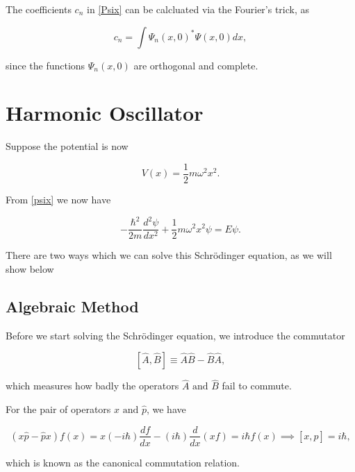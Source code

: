 \documentclass[a4paper,12pt]{report}
\begin{document}
The coefficients \(c_{n} \) in \cref{Psix} can be calcluated via the Fourier's trick, as 

\begin{equation}
  c_{n} = \int \Psi _{n}(x,0)^* \Psi (x,0) dx,  
\end{equation}

since the functions \(\Psi _{n}(x,0) \) are orthogonal and complete.

\section{Harmonic Oscillator}

Suppose the potential is now 

\begin{equation}
  V(x) = \frac{1}{2}m \omega ^2x^2. 
\end{equation}

From \cref{psix} we now have

\begin{equation}
  - \frac{\hbar ^2}{2m}\frac{d^2\psi }{dx^2} + \frac{1}{2}m \omega ^2x^2\psi = E\psi . \label{harmonic} 
\end{equation}

There are two ways which we can solve this Schrödinger equation, as we will show below

\subsection{Algebraic Method}

Before we start solving the Schrödinger equation, we introduce the commutator


\begin{equation}
  \left[ \hat{A} , \hat{B}  \right] \equiv \hat{A} \hat{B} - \hat{B} \hat{A},
\end{equation}

which measures how badly the operators \(\hat{A} \text { and } \hat{B} \) fail to commute. 

For the pair of operators \(x \text { and } \hat{p} \), we have

\begin{equation}
  (x \hat{p} - \hat{p} x )f(x) = x(-i \hbar )\frac{df}{dx} -(i \hbar )\frac{d}{dx}(xf) = i \hbar f(x) \implies \left[ x, \hat{p}  \right] = i \hbar ,
\end{equation}

which is known as the canonical commutation relation.
\end{document}
